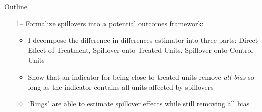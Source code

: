 \documentclass[aspectratio=169]{beamer}
\begin{document}

\begin{frame}{Outline}

    \begin{itemize}
        \item[1--] Formalize spillovers into a potential outcomes framework:
 
        \begin{citecolor}
        \end{citecolor}

        \begin{itemize}
            \vspace{2.5mm}
            \item I decompose the difference-in-differences estimator into three parts: Direct Effect of Treatment, Spillover onto Treated Units, Spillover onto Control Units
            
            \vspace{2.5mm}
            \item Show that an indicator for being close to treated units remove \textit{all bias} so long as the indicator contains all units affected by spillovers
            
            \vspace{2.5mm}
            \item `Rings' are able to estimate spillover effects while still removing all bias
        \end{itemize} 

    \end{itemize}
\end{frame}
\end{document}
